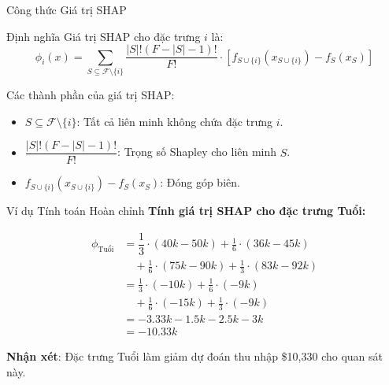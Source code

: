 \documentclass[notheorems, aspectratio=149]{beamer}
\begin{document}
\begin{frame}{Công thức Giá trị SHAP}
\begin{block}{Định nghĩa}
Giá trị SHAP cho đặc trưng $i$ là:
\begin{equation}
\phi_i(x) = \sum_{S \subseteq \mathcal{F} \setminus \{i\}} \frac{|S|!(F-|S|-1)!}{F!} \cdot \left[f_{S \cup \{i\}}(x_{S \cup \{i\}}) - f_S(x_S)\right]
\end{equation}
\end{block}

\begin{alertblock}{Các thành phần của giá trị SHAP:}
\begin{itemize}
    \item $S \subseteq \mathcal{F} \setminus \{i\}$: Tất cả liên minh không chứa đặc trưng $i$.
    \item $\dfrac{|S|!(F-|S|-1)!}{F!}$: Trọng số Shapley cho liên minh $S$.
    \item $f_{S \cup \{i\}}(x_{S \cup \{i\}}) - f_S(x_S)$: Đóng góp biên.
\end{itemize}
\end{alertblock}
\end{frame}

\begin{frame}{Ví dụ Tính toán Hoàn chỉnh}
\textbf{Tính giá trị SHAP cho đặc trưng Tuổi:}

\begin{align*}
\phi_{\text{Tuổi}} &= \dfrac{1}{3} \cdot (40k - 50k) + \frac{1}{6} \cdot (36k - 45k) \\
&\quad + \frac{1}{6} \cdot (75k - 90k) + \frac{1}{3} \cdot (83k - 92k) \\
&= \frac{1}{3} \cdot (-10k) + \frac{1}{6} \cdot (-9k) \\
&\quad + \frac{1}{6} \cdot (-15k) + \frac{1}{3} \cdot (-9k) \\
&= -3.33k - 1.5k - 2.5k - 3k \\
&= \boxed{-10.33k}
\end{align*}

\textbf{Nhận xét}: Đặc trưng Tuổi làm giảm dự đoán thu nhập \$10,330 cho quan sát này.
\end{frame}
\end{document}
